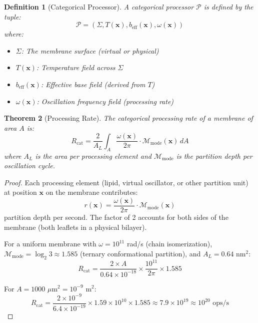 \documentclass[twocolumn,10pt]{article}
\newtheorem{theorem}{Theorem}[section]
\newtheorem{definition}[theorem]{Definition}
\theoremstyle{remark}
\newcommand{\Depth}{\mathcal{M}}
\begin{document}
\begin{definition}[Categorical Processor]
\label{def:cat_processor}
A categorical processor $\mathcal{P}$ is defined by the tuple:
\begin{equation}
    \mathcal{P} = (\Sigma, T(\mathbf{x}), b_{\text{eff}}(\mathbf{x}), \omega(\mathbf{x}))
\end{equation}
where:
\begin{itemize}
    \item $\Sigma$: The membrane surface (virtual or physical)
    \item $T(\mathbf{x})$: Temperature field across $\Sigma$
    \item $b_{\text{eff}}(\mathbf{x})$: Effective base field (derived from $T$)
    \item $\omega(\mathbf{x})$: Oscillation frequency field (processing rate)
\end{itemize}
\end{definition}

\begin{theorem}[Processing Rate]
\label{thm:processing_rate}
The categorical processing rate of a membrane of area $A$ is:
\begin{equation}
    R_{\text{cat}} = \frac{2}{A_L} \int_A \frac{\omega(\mathbf{x})}{2\pi} \cdot \Depth_{\text{mode}}(\mathbf{x}) \, dA
\end{equation}
where $A_L$ is the area per processing element and $\Depth_{\text{mode}}$ is the partition depth per oscillation cycle.
\end{theorem}

\begin{proof}
Each processing element (lipid, virtual oscillator, or other partition unit) at position $\mathbf{x}$ on the membrane contributes:
\begin{equation}
    r(\mathbf{x}) = \frac{\omega(\mathbf{x})}{2\pi} \cdot \Depth_{\text{mode}}(\mathbf{x})
\end{equation}
partition depth per second. The factor of 2 accounts for both sides of the membrane (both leaflets in a physical bilayer).

For a uniform membrane with $\omega = 10^{11}$ rad/s (chain isomerization), $\Depth_{\text{mode}} = \log_2 3 \approx 1.585$ (ternary conformational partition), and $A_L = 0.64$ nm$^2$:
\begin{equation}
    R_{\text{cat}} = \frac{2 \times A}{0.64 \times 10^{-18}} \times \frac{10^{11}}{2\pi} \times 1.585
\end{equation}

For $A = 1000$ $\mu$m$^2 = 10^{-9}$ m$^2$:
\begin{equation}
    R_{\text{cat}} = \frac{2 \times 10^{-9}}{6.4 \times 10^{-19}} \times 1.59 \times 10^{10} \times 1.585 \approx 7.9 \times 10^{19} \approx 10^{20} \text{ ops/s}
\end{equation}
\end{proof}
\end{document}
